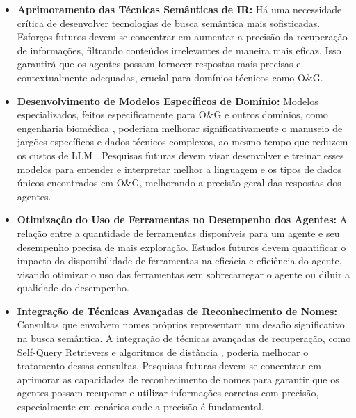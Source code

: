             \begin{itemize}
            
                \item \textbf{Aprimoramento das Técnicas Semânticas de IR:}
                    Há uma necessidade crítica de desenvolver tecnologias de busca semântica mais sofisticadas. Esforços futuros devem se concentrar em aumentar a precisão da recuperação de informações, filtrando conteúdos irrelevantes de maneira mais eficaz. Isso garantirá que os agentes possam fornecer respostas mais precisas e contextualmente adequadas, crucial para domínios técnicos como O\&G.
                    
                \item \textbf{Desenvolvimento de Modelos Específicos de Domínio:}
                     Modelos especializados, feitos especificamente para O\&G e outros domínios, como engenharia biomédica \cite{Pal2024}, poderiam melhorar significativamente o manuseio de jargões específicos e dados técnicos complexos, ao mesmo tempo que reduzem os custos de LLM \cite{Arefeen2024}. Pesquisas futuras devem visar desenvolver e treinar esses modelos para entender e interpretar melhor a linguagem e os tipos de dados únicos encontrados em O\&G, melhorando a precisão geral das respostas dos agentes.
                    
                \item \textbf{Otimização do Uso de Ferramentas no Desempenho dos Agentes:}
                    A relação entre a quantidade de ferramentas disponíveis para um agente e seu desempenho precisa de mais exploração. Estudos futuros devem quantificar o impacto da disponibilidade de ferramentas na eficácia e eficiência do agente, visando otimizar o uso das ferramentas sem sobrecarregar o agente ou diluir a qualidade do desempenho.
                    
                \item \textbf{Integração de Técnicas Avançadas de Reconhecimento de Nomes:}
                    Consultas que envolvem nomes próprios representam um desafio significativo na busca semântica. A integração de técnicas avançadas de recuperação, como Self-Query Retrievers \cite{LangchainSelfQuery2023} e algoritmos de distância \cite{Levenshtein1966}, poderia melhorar o tratamento dessas consultas. Pesquisas futuras devem se concentrar em aprimorar as capacidades de reconhecimento de nomes para garantir que os agentes possam recuperar e utilizar informações corretas com precisão, especialmente em cenários onde a precisão é fundamental.
                    

\end{itemize}
